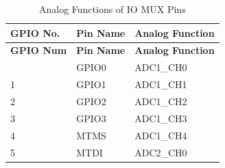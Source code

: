    \begin{longtable}[c]{|p{2cm}|p{2.5cm}|p{3cm}| }
   \caption{Analog Functions of IO MUX Pins}
    \label{tab:iomuxgpio-iomax-pins-analog-functions} \\
        \hline
        \rowcolor{lightgray}
        \textbf{GPIO No.} & \textbf{Pin Name} & \textbf{Analog Function} \\
        \hline
        \endfirsthead
        \hline
        \rowcolor{lightgray}
        \textbf{GPIO Num} & \textbf{Pin Name} & \textbf{Analog Function} \\
        \hline
        \endhead
        \endfoot
 0 & GPIO0 & ADC1\_CH0                  \\
\hline
 1 & GPIO1  & ADC1\_CH1                 \\
\hline
 2 & GPIO2             & ADC1\_CH2                 \\
\hline
 3 & GPIO3            & ADC1\_CH3                 \\
\hline
4 & MTMS              & ADC1\_CH4                  \\\hline
 5 & MTDI             & ADC2\_CH0                 \\
\hline


\end{longtable}

